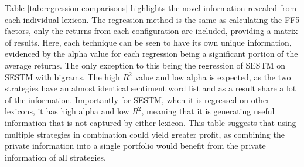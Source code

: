 Table \ref{tab:regression-comparisons} highlights the novel information revealed from each individual lexicon. The regression method is the same as calculating the FF5 factors, only the returns from each configuration are included, providing a matrix of results. Here, each technique can be seen to have its own unique information, evidenced by the alpha value for each regression being a significant portion of the average returns. The only exception to this being the regression of SESTM on SESTM with bigrams. The high $R^2$ value and low alpha is expected, as the two strategies have an almost identical sentiment word list and as a result share a lot of the information. Importantly for SESTM, when it is regressed on other lexicons, it has high alpha and low $R^2$, meaning that it is generating useful information that is not captured by either lexicon. This table suggests that using multiple strategies in combination could yield greater profit, as combining the private information into a single portfolio would benefit from the private information of all strategies.






